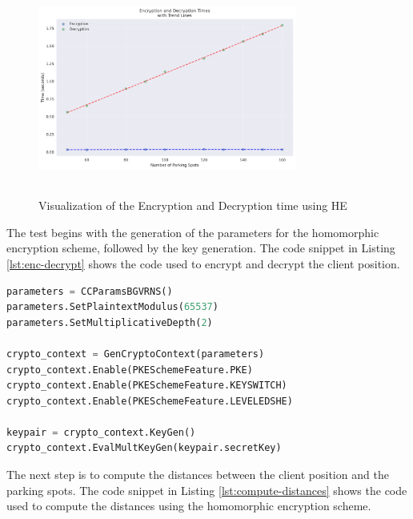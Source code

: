 \begin{figure}[h]
    \centering
    \includegraphics[width=8.5cm,height=7cm]{img/crypto_times.png}
    \caption{Visualization of the Encryption and Decryption time using HE}
    \label{fig:testing-enc}
\end{figure}

The test begins with the generation of the parameters for the homomorphic encryption scheme, followed by the key generation. The code snippet in Listing \ref{lst:enc-decrypt} shows the code used to encrypt and decrypt the client position.

\newpage

\begin{lstlisting}[language=python, caption={Encryption and Decryption of the client position}, label={lst:enc-decrypt}]
parameters = CCParamsBGVRNS()
parameters.SetPlaintextModulus(65537)
parameters.SetMultiplicativeDepth(2)

crypto_context = GenCryptoContext(parameters)
crypto_context.Enable(PKESchemeFeature.PKE)
crypto_context.Enable(PKESchemeFeature.KEYSWITCH)
crypto_context.Enable(PKESchemeFeature.LEVELEDSHE)

keypair = crypto_context.KeyGen()
crypto_context.EvalMultKeyGen(keypair.secretKey)
\end{lstlisting}


The next step is to compute the distances between the client position and the parking spots. The code snippet in Listing \ref{lst:compute-distances} shows the code used to compute the distances using the homomorphic encryption scheme.

